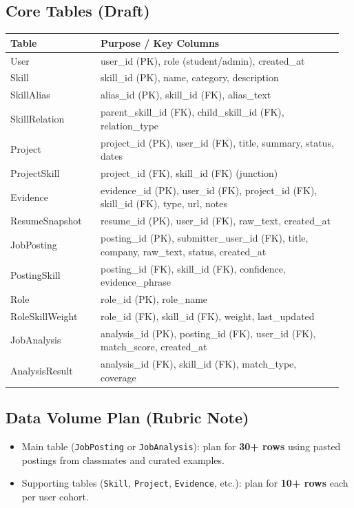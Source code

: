 \documentclass[11pt]{article}
\begin{document}
\subsection{Core Tables (Draft)}
\begin{longtable}{p{0.26\linewidth} p{0.70\linewidth}}
\toprule
\textbf{Table} & \textbf{Purpose / Key Columns} \\
\midrule
\endhead

User & user\_id (PK), role (student/admin), created\_at \\
Skill & skill\_id (PK), name, category, description \\
SkillAlias & alias\_id (PK), skill\_id (FK), alias\_text \\
SkillRelation & parent\_skill\_id (FK), child\_skill\_id (FK), relation\_type \\
Project & project\_id (PK), user\_id (FK), title, summary, status, dates \\
ProjectSkill & project\_id (FK), skill\_id (FK) (junction) \\
Evidence & evidence\_id (PK), user\_id (FK), project\_id (FK), skill\_id (FK), type, url, notes \\
ResumeSnapshot & resume\_id (PK), user\_id (FK), raw\_text, created\_at \\
JobPosting & posting\_id (PK), submitter\_user\_id (FK), title, company, raw\_text, status, created\_at \\
PostingSkill & posting\_id (FK), skill\_id (FK), confidence, evidence\_phrase \\
Role & role\_id (PK), role\_name \\
RoleSkillWeight & role\_id (FK), skill\_id (FK), weight, last\_updated \\
JobAnalysis & analysis\_id (PK), posting\_id (FK), user\_id (FK), match\_score, created\_at \\
AnalysisResult & analysis\_id (FK), skill\_id (FK), match\_type, coverage \\
\bottomrule
\end{longtable}

\subsection{Data Volume Plan (Rubric Note)}
\begin{itemize}[leftmargin=*]
  \item Main table (\texttt{JobPosting} or \texttt{JobAnalysis}): plan for \textbf{30+ rows} using pasted postings from classmates and curated examples.
  \item Supporting tables (\texttt{Skill}, \texttt{Project}, \texttt{Evidence}, etc.): plan for \textbf{10+ rows} each per user cohort.
\end{itemize}
\end{document}
